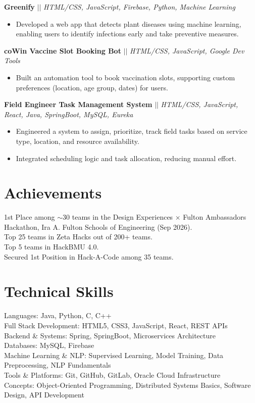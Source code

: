 \documentclass[10pt,letterpaper]{article}
\newcommand{\project}[2]{\textbf{#1} $||$ \textit{#2}\vspace{-1pt}}
\begin{document}
\project{Greenify}{HTML/CSS, JavaScript, Firebase, Python, Machine Learning}
\begin{itemize}
  \item Developed a web app that detects plant diseases using machine learning, enabling users to identify infections early and
        take preventive measures.
\end{itemize}

\project{coWin Vaccine Slot Booking Bot}{HTML/CSS, JavaScript, Google Dev Tools}
\begin{itemize}
  \item Built an automation tool to book vaccination slots, supporting custom preferences (location, age group, dates) for
        users.
\end{itemize}

\project{Field Engineer Task Management System}{HTML/CSS, JavaScript, React, Java, SpringBoot, MySQL, Eureka}
\begin{itemize}
  \item Engineered a system to assign, prioritize, track field tasks based on service type, location, and resource availability.
  \item Integrated scheduling logic and task allocation, reducing manual effort.
\end{itemize}

\section*{Achievements}
1st Place among $\sim$30 teams in the Design Experiences $\times$ Fulton Ambassadors Hackathon, Ira A. Fulton Schools of Engineering (Sep 2026).\\
Top 25 teams in Zeta Hacks out of 200+ teams.\\
Top 5 teams in HackBMU 4.0.\\
Secured 1st Position in Hack-A-Code among 35 teams.

\section*{Technical Skills}
Languages: Java, Python, C, C++\\
Full Stack Development: HTML5, CSS3, JavaScript, React, REST APIs\\
Backend \& Systems: Spring, SpringBoot, Microservices Architecture\\
Databases: MySQL, Firebase\\
Machine Learning \& NLP: Supervised Learning, Model Training, Data Preprocessing, NLP Fundamentals\\
Tools \& Platforms: Git, GitHub, GitLab, Oracle Cloud Infrastructure\\
Concepts: Object-Oriented Programming, Distributed Systems Basics, Software Design, API Development
\end{document}
